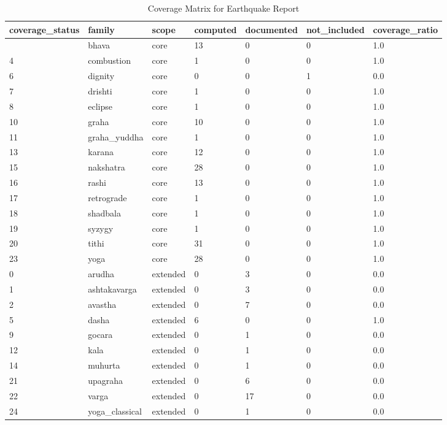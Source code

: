 \documentclass[
  11pt,
  a4paper,
  oneside,
  openany]{report}
\begin{document}
\begin{longtable}[]{@{}lllllll@{}}

\caption{\label{tbl-eq-vedic-coverage}Coverage Matrix for Earthquake
Report}

\tabularnewline

\toprule\noalign{}
coverage\_status & family & scope & computed & documented &
not\_included & coverage\_ratio \\
\midrule\noalign{}
\endhead
\bottomrule\noalign{}
\endlastfoot
3 & bhava & core & 13 & 0 & 0 & 1.0 \\
4 & combustion & core & 1 & 0 & 0 & 1.0 \\
6 & dignity & core & 0 & 0 & 1 & 0.0 \\
7 & drishti & core & 1 & 0 & 0 & 1.0 \\
8 & eclipse & core & 1 & 0 & 0 & 1.0 \\
10 & graha & core & 10 & 0 & 0 & 1.0 \\
11 & graha\_yuddha & core & 1 & 0 & 0 & 1.0 \\
13 & karana & core & 12 & 0 & 0 & 1.0 \\
15 & nakshatra & core & 28 & 0 & 0 & 1.0 \\
16 & rashi & core & 13 & 0 & 0 & 1.0 \\
17 & retrograde & core & 1 & 0 & 0 & 1.0 \\
18 & shadbala & core & 1 & 0 & 0 & 1.0 \\
19 & syzygy & core & 1 & 0 & 0 & 1.0 \\
20 & tithi & core & 31 & 0 & 0 & 1.0 \\
23 & yoga & core & 28 & 0 & 0 & 1.0 \\
0 & arudha & extended & 0 & 3 & 0 & 0.0 \\
1 & ashtakavarga & extended & 0 & 3 & 0 & 0.0 \\
2 & avastha & extended & 0 & 7 & 0 & 0.0 \\
5 & dasha & extended & 6 & 0 & 0 & 1.0 \\
9 & gocara & extended & 0 & 1 & 0 & 0.0 \\
12 & kala & extended & 0 & 1 & 0 & 0.0 \\
14 & muhurta & extended & 0 & 1 & 0 & 0.0 \\
21 & upagraha & extended & 0 & 6 & 0 & 0.0 \\
22 & varga & extended & 0 & 17 & 0 & 0.0 \\
24 & yoga\_classical & extended & 0 & 1 & 0 & 0.0 \\

\end{longtable}
\end{document}
